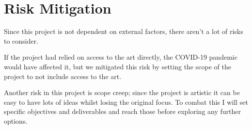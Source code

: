 \section{Risk Mitigation}
Since this project is not dependent on external factors, there aren't a lot of risks to
consider.

If the project had relied on access to the art directly, the COVID-19 pandemic
would have affected it, but we mitigated this risk by setting the scope of the
project to not include access to the art.

Another risk in this project is scope creep; since the project is artistic it
can be easy to have lots of ideas whilst losing the original focus. To combat
this I will set specific objectives and deliverables and reach those before
exploring any further options.
